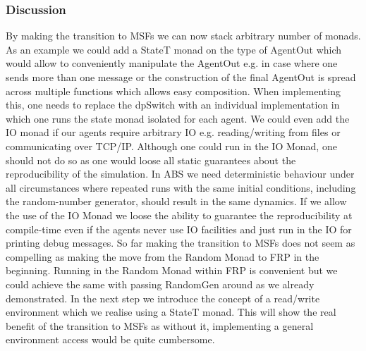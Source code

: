\subsubsection{Discussion}
By making the transition to MSFs we can now stack arbitrary number of monads. As an example we could add a StateT monad on the type of AgentOut which would allow to conveniently manipulate the AgentOut e.g. in case where one sends more than one message or the construction of the final AgentOut is spread across multiple functions which allows easy composition. When implementing this, one needs to replace the dpSwitch with an individual implementation in which one runs the state monad isolated for each agent.
We could even add the IO monad if our agents require arbitrary IO e.g. reading/writing from files or communicating over TCP/IP. Although one could run in the IO Monad, one should not do so as one would loose all static guarantees about the reproducibility of the simulation. In ABS we need deterministic behaviour under all circumstances where repeated runs with the same initial conditions, including the random-number generator, should result in the same dynamics. If we allow the use of the IO Monad we loose the ability to guarantee the reproducibility at compile-time even if the agents never use IO facilities and just run in the IO for printing debug messages.
So far making the transition to MSFs does not seem as compelling as making the move from the Random Monad to FRP in the beginning. Running in the Random Monad within FRP is convenient but we could achieve the same with passing RandomGen around as we already demonstrated. In the next step we introduce the concept of a read/write environment which we realise using a StateT monad. This will show the real benefit of the transition to MSFs as without it, implementing a general environment access would be quite cumbersome.